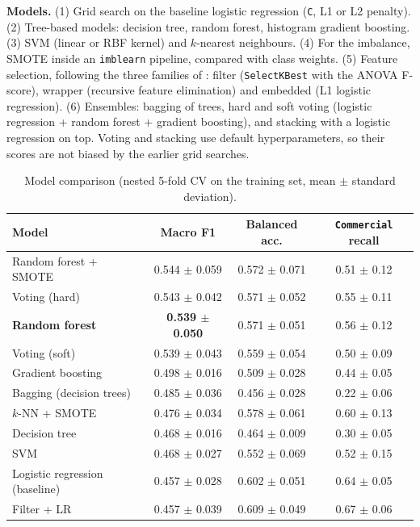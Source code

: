 \documentclass{article}
\begin{document}
\textbf{Models.} (1) Grid search on the baseline logistic regression (\texttt{C}, L1 or L2 penalty). (2) Tree-based models: decision tree, random forest, histogram gradient boosting. (3) SVM (linear or RBF kernel) and $k$-nearest neighbours. (4) For the imbalance, SMOTE inside an \texttt{imblearn} pipeline, compared with class weights. (5) Feature selection, following the three families of \citet{cheng2024}: filter (\texttt{SelectKBest} with the ANOVA F-score), wrapper (recursive feature elimination) and embedded (L1 logistic regression). (6) Ensembles: bagging of trees, hard and soft voting (logistic regression + random forest + gradient boosting), and stacking with a logistic regression on top. Voting and stacking use default hyperparameters, so their scores are not biased by the earlier grid searches.

\begin{table}[h]
  \centering
  \small
  \caption{Model comparison (nested 5-fold CV on the training set, mean $\pm$ standard deviation).}
  \label{tab:models}
  \begin{tabular}{lccc}
    \toprule
    Model & Macro F1 & Balanced acc. & \texttt{Commercial} recall \\
    \midrule
    Random forest + SMOTE & 0.544 $\pm$ 0.059 & 0.572 $\pm$ 0.071 & 0.51 $\pm$ 0.12 \\
    Voting (hard) & 0.543 $\pm$ 0.042 & 0.571 $\pm$ 0.052 & 0.55 $\pm$ 0.11 \\
    \textbf{Random forest} & \textbf{0.539 $\pm$ 0.050} & 0.571 $\pm$ 0.051 & 0.56 $\pm$ 0.12 \\
    Voting (soft) & 0.539 $\pm$ 0.043 & 0.559 $\pm$ 0.054 & 0.50 $\pm$ 0.09 \\
    Gradient boosting & 0.498 $\pm$ 0.016 & 0.509 $\pm$ 0.028 & 0.44 $\pm$ 0.05 \\
    Bagging (decision trees) & 0.485 $\pm$ 0.036 & 0.456 $\pm$ 0.028 & 0.22 $\pm$ 0.06 \\
    $k$-NN + SMOTE & 0.476 $\pm$ 0.034 & 0.578 $\pm$ 0.061 & 0.60 $\pm$ 0.13 \\
    Decision tree & 0.468 $\pm$ 0.016 & 0.464 $\pm$ 0.009 & 0.30 $\pm$ 0.05 \\
    SVM & 0.468 $\pm$ 0.027 & 0.552 $\pm$ 0.069 & 0.52 $\pm$ 0.15 \\
    \midrule
    Logistic regression (baseline) & 0.457 $\pm$ 0.028 & 0.602 $\pm$ 0.051 & 0.64 $\pm$ 0.05 \\
    Filter + LR & 0.457 $\pm$ 0.039 & 0.609 $\pm$ 0.049 & 0.67 $\pm$ 0.06 \\

\end{tabular}
\end{table}
\end{document}
